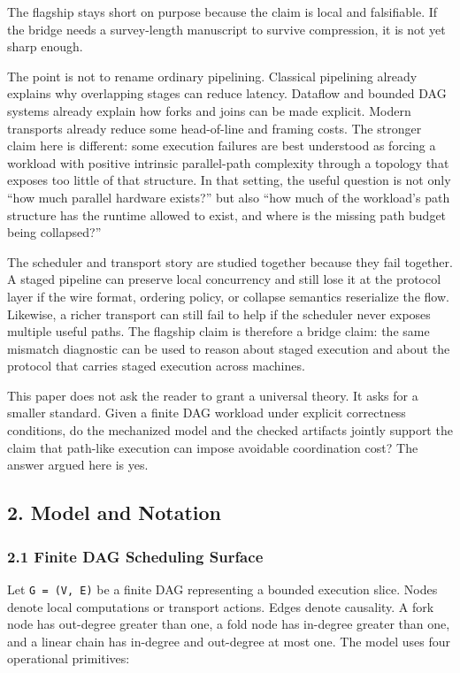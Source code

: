 \documentclass[
  11pt,
]{article}
\begin{document}
The flagship stays short on purpose because the claim is local and
falsifiable. If the bridge needs a survey-length manuscript to survive
compression, it is not yet sharp enough.

The point is not to rename ordinary pipelining. Classical pipelining
already explains why overlapping stages can reduce latency. Dataflow and
bounded DAG systems already explain how forks and joins can be made
explicit. Modern transports already reduce some head-of-line and framing
costs. The stronger claim here is different: some execution failures are
best understood as forcing a workload with positive intrinsic
parallel-path complexity through a topology that exposes too little of
that structure. In that setting, the useful question is not only ``how
much parallel hardware exists?'' but also ``how much of the workload's
path structure has the runtime allowed to exist, and where is the
missing path budget being collapsed?''

The scheduler and transport story are studied together because they fail
together. A staged pipeline can preserve local concurrency and still
lose it at the protocol layer if the wire format, ordering policy, or
collapse semantics reserialize the flow. Likewise, a richer transport
can still fail to help if the scheduler never exposes multiple useful
paths. The flagship claim is therefore a bridge claim: the same mismatch
diagnostic can be used to reason about staged execution and about the
protocol that carries staged execution across machines.

This paper does not ask the reader to grant a universal theory. It asks
for a smaller standard. Given a finite DAG workload under explicit
correctness conditions, do the mechanized model and the checked
artifacts jointly support the claim that path-like execution can impose
avoidable coordination cost? The answer argued here is yes.

\subsection{2. Model and Notation}\label{model-and-notation}

\subsubsection{2.1 Finite DAG Scheduling
Surface}\label{finite-dag-scheduling-surface}

Let \texttt{G\ =\ (V,\ E)} be a finite DAG representing a bounded
execution slice. Nodes denote local computations or transport actions.
Edges denote causality. A fork node has out-degree greater than one, a
fold node has in-degree greater than one, and a linear chain has
in-degree and out-degree at most one. The model uses four operational
primitives:
\end{document}
